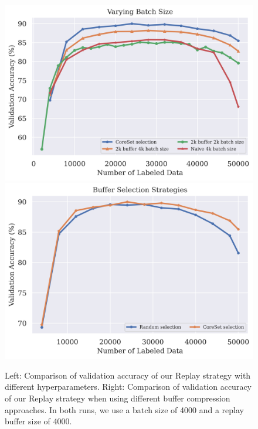 \begin{figure}[h]
    \centering
    \includegraphics[width=0.45\linewidth]{images/results_CAL/replay_varying_batch_size.png} \hfill
    \includegraphics[width=0.45\linewidth]{images/results_CAL/replay_buffer_selection.png}
    \caption[Continual Active Learning Custom Replay strategy]{Left: Comparison of validation accuracy of our Replay strategy with different hyperparameters. Right: Comparison of validation accuracy of our Replay strategy when using different buffer compression approaches.
    In both runs, we use a batch size of 4000 and a replay buffer size of 4000.}
    \label{fig:Evaluation:Results:CAL:Replay}
\end{figure}


